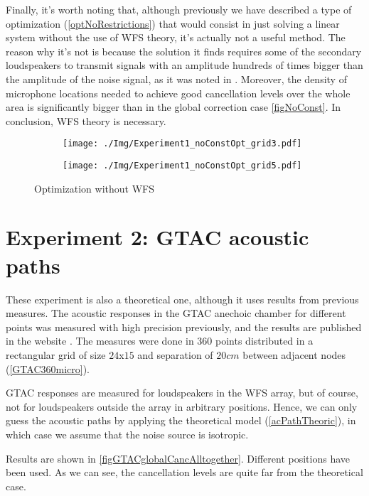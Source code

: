 Finally, it's worth noting that, although previously we have described a type of optimization (\autoref{optNoRestrictions}) that would consist in just solving a linear system without the use of WFS theory, it's actually not a useful method. The reason why it's not is because the solution it finds requires some of the secondary loudspeakers to transmit signals with an amplitude hundreds of times bigger than the amplitude of the noise signal, as it was noted in \cite{Lapini2016}. Moreover, the density of microphone locations needed to achieve good cancellation levels over the whole area is significantly bigger than in the global correction case \autoref{figNoConst}. In conclusion, WFS theory is necessary.

\begin{figure}[H]
	\centering
	\begin{subfigure}[b]{0.49\textwidth}
		\centering
		\texttt{[image: ./Img/Experiment1\_noConstOpt\_grid3.pdf]}
		\caption{}
	\end{subfigure}
	\begin{subfigure}[b]{0.49\textwidth}
		\centering
		\texttt{[image: ./Img/Experiment1\_noConstOpt\_grid5.pdf]}
		\caption{}
	\end{subfigure}
	\caption{Optimization without WFS}
	\label{figNoConst}
\end{figure}

\section{Experiment 2: GTAC acoustic paths}
These experiment is also a theoretical one, although it uses results from previous measures. The acoustic responses in the GTAC anechoic chamber for different points was measured with high precision previously, and the results are published in the website \cite{GTACroom}. The measures were done in 360 points distributed in a rectangular grid of size $24$x$15$ and separation of $20 \si{cm}$ between adjacent nodes (\autoref{GTAC360micro}).

GTAC responses are measured for loudspeakers in the WFS array, but of course, not for loudspeakers outside the array in arbitrary positions. Hence, we can only guess the acoustic paths by applying the theoretical model (\autoref{acPathTheoric}), in which case we assume that the noise source is isotropic.

Results are shown in \autoref{figGTACglobalCancAlltogether}. Different positions have been used. As we can see, the cancellation levels are quite far from the theoretical case.

